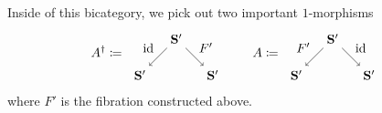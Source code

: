 \documentclass[11pt]{amsart}
\newcommand{\cat}[1]{\mathbf{#1}}
\DeclareMathOperator{\id}{id}
\theoremstyle{remark}
\theoremstyle{definition}
\begin{document}
Inside of this bicategory, we pick out two important $1$-morphisms
\[
	A^\dagger \coloneqq 
	\raisebox{-0.5\height}{
	\begin{tikzpicture}
		\node (lleg) at (-1,0) {$\cat{S}'$};
		\node (apex) at (0,1) {$\cat{S}'$};
		\node (rleg) at (1,0) {$\cat{S}'$};
		\draw [->] (apex) to node[above left] {$\id$} (lleg);
		\draw [->] (apex) to node[above right] {$F'$} (rleg);
	\end{tikzpicture}
	}
	\quad \quad 
	A \coloneqq 
	\raisebox{-0.5\height}{
	\begin{tikzpicture}
		\node (lleg) at (-1,0) {$\cat{S}'$};
		\node (apex) at (0,1) {$\cat{S}'$};
		\node (rleg) at (1,0) {$\cat{S}'$};
		\draw [->] (apex) to node[above right] {$\id$} (rleg);
		\draw [->] (apex) to node[above left] {$F'$} (lleg);
	\end{tikzpicture}
	}
\]
where $F'$ is the fibration constructed above.
\end{document}
